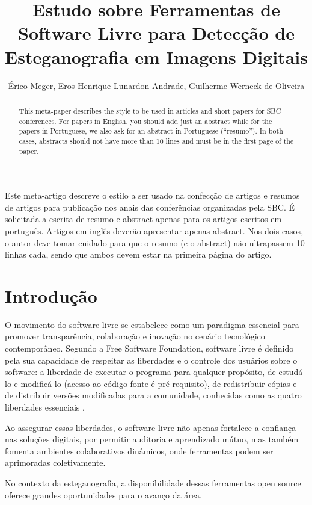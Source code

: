 \documentclass[12pt]{article}
\title{Estudo sobre Ferramentas de Software Livre para Detecção de Esteganografia em Imagens Digitais}
\author{Érico Meger\inst{1}, Eros Henrique Lunardon Andrade\inst{1}, Guilherme Werneck de Oliveira\inst{1}}
\begin{document}
\maketitle

\begin{abstract}
  This meta-paper describes the style to be used in articles and short papers
  for SBC conferences. For papers in English, you should add just an abstract
  while for the papers in Portuguese, we also ask for an abstract in
  Portuguese (``resumo''). In both cases, abstracts should not have more than
  10 lines and must be in the first page of the paper.
\end{abstract}

\begin{resumo}
  Este meta-artigo descreve o estilo a ser usado na confecção de artigos e
  resumos de artigos para publicação nos anais das conferências organizadas
  pela SBC. É solicitada a escrita de resumo e abstract apenas para os artigos
  escritos em português. Artigos em inglês deverão apresentar apenas abstract.
  Nos dois casos, o autor deve tomar cuidado para que o resumo (e o abstract)
  não ultrapassem 10 linhas cada, sendo que ambos devem estar na primeira
  página do artigo.
\end{resumo}

\section{Introdução}

O movimento do software livre se estabelece como um paradigma essencial para
promover transparência, colaboração e inovação no cenário tecnológico
contemporâneo. Segundo a Free Software Foundation, software livre é definido
pela sua capacidade de respeitar as liberdades e o controle dos usuários sobre
o software: a liberdade de executar o programa para qualquer propósito, de
estudá-lo e modificá-lo (acesso ao código-fonte é pré-requisito), de
redistribuir cópias e de distribuir versões modificadas para a comunidade,
conhecidas como as quatro liberdades essenciais \cite{gnu_freesw}.

Ao assegurar essas liberdades, o software livre não apenas fortalece a
confiança nas soluções digitais, por permitir auditoria e aprendizado mútuo,
mas também fomenta ambientes colaborativos dinâmicos, onde ferramentas podem
ser aprimoradas coletivamente.

No contexto da esteganografia, a disponibilidade dessas ferramentas open source
oferece grandes oportunidades para o avanço da área. %
\end{document}
